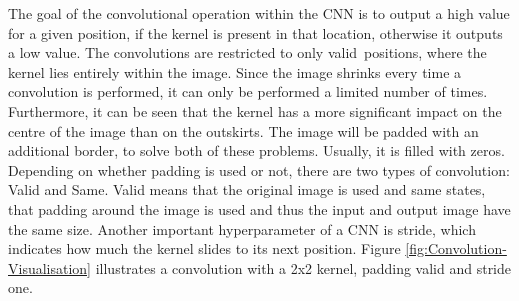 The goal of the convolutional operation within the \gls{CNN} is to output a high value for a given position, if the kernel is present in that location, otherwise it outputs a low value. The convolutions are restricted to only \flqq valid\frqq \ positions, where the kernel lies entirely within the image. Since the image shrinks every time a convolution is performed, it can only be performed a limited number of times. Furthermore, it can be seen that the kernel has a more significant impact on the centre of the image than on the outskirts. The image will be padded with an additional border, to solve both of these problems. Usually, it is filled with zeros. Depending on whether padding is used or not, there are two types of convolution: Valid and Same. Valid means that the original image is used and same states, that padding around the image is used and thus the input and output image have the same size. Another important hyperparameter of a \gls{CNN} is stride, which indicates how much the kernel slides to its next position. Figure \ref{fig:Convolution-Visualisation} illustrates a convolution with a 2x2 kernel, padding valid and stride one. 

